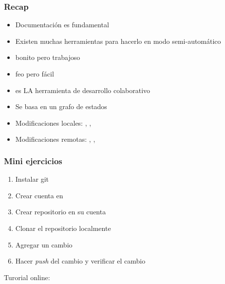\documentclass[14pt,aspectratio=169,xcolor=dvipsnames]{beamer}
\begin{document}
\begin{frame}\frametitle{Recap}
    \begin{itemize}
        \item Documentación es fundamental
        \item Existen muchas herramientas para hacerlo en modo semi-automático
        \item {} bonito pero trabajoso
        \item {} feo pero fácil
        \item {} es LA herramienta de desarrollo colaborativo
        \item Se basa en un grafo de estados
        \item Modificaciones locales: , , 
        \item Modificaciones remotas: , , 
    \end{itemize}
\end{frame}
\begin{frame}
    \maketitle
\end{frame}
\begin{frame}[noframenumbering]\frametitle{Mini ejercicios}
    \begin{enumerate}
        \item Instalar git
        \item Crear cuenta en 
        \item Crear repositorio en su cuenta
        \item Clonar el repositorio localmente
        \item Agregar un cambio
        \item Hacer \emph{push} del cambio y verificar el cambio
    \end{enumerate}
    
    \begin{center}
        Turorial online: 
    \end{center}
\end{frame}
\begin{frame}
    \maketitle
\end{frame}
\end{document}

